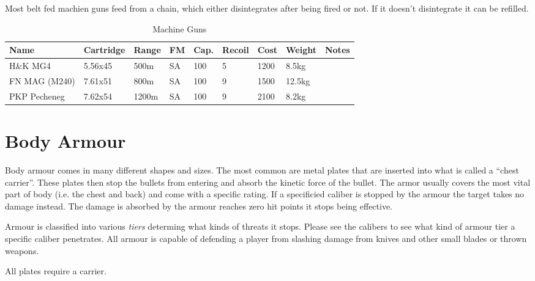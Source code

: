 Most belt fed machien guns feed from a chain, which either disintegrates after
being fired or not. If it doesn't disintegrate it can be refilled.

\begin{table}
  \caption{Machine Guns}
  \label{tab:LMG}
  \begin{center}
    \begin{tabular}{| l | l | l | l | l | l | l | l | l |}
      \hline
      \textbf{Name} & \textbf{Cartridge} & \textbf{Range} &
      \textbf{FM} & \textbf{Cap.} & \textbf{Recoil} &
      \textbf{Cost} & \textbf{Weight} & \textbf{Notes} \\ \hline


      H\&K MG4      & 5.56x45 &  500m & SA & 100 & 5 & 1200 &  8.5kg & \\ \hline
      FN MAG (M240) & 7.61x51 &  800m & SA & 100 & 9 & 1500 & 12.5kg & \\ \hline
      PKP Pecheneg  & 7.62x54 & 1200m & SA & 100 & 9 & 2100 &  8.2kg & \\ \hline

    \end{tabular}
  \end{center}
\end{table}

\section{Body Armour}

Body armour comes in many different shapes and sizes. The most common are metal
plates that are inserted into what is called a ``chest carrier''. These plates
then stop the bullets from entering and absorb the kinetic force of the bullet.
The armor usually covers the most vital part of body (i.e. the chest and back)
and come with a specific rating. If a specificied caliber is stopped by the
armour the target takes no damage instead. The damage is absorbed by the armour
reaches zero hit points it stops being effective.

Armour is classified into various \emph{tiers} determing what kinds of threats
it stops. Please see the calibers to see what kind of armour tier a specific
caliber penetrates. All armour is capable of defending a player from slashing
damage from knives and other small blades or thrown weapons.

All plates require a carrier.

